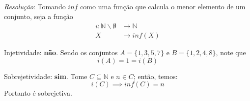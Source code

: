 \emph{Resolução}: Tomando $inf$ como uma função que calcula o menor elemento de um conjunto, seja a função
\begin{align*}
    i: \mathbb{N}\backslash \emptyset &\rightarrow \mathbb{N} \\
    X &\rightarrow inf(X)
\end{align*}
\par Injetividade: \textbf{não}. Sendo os conjuntos $A = \{ 1, 3, 5, 7\}$ e $B = \{ 1, 2, 4, 8 \}$, note que
    \begin{displaymath}
        i(A) = 1 = i(B)
    \end{displaymath}
\par Sobrejetividade: \textbf{sim}. Tome $C \subseteq \mathbb{N}$ e $n \in C$; então, temos:
    \begin{displaymath}
        i(C) \implies inf(C) = n
    \end{displaymath}
    Portanto é sobrejetiva.